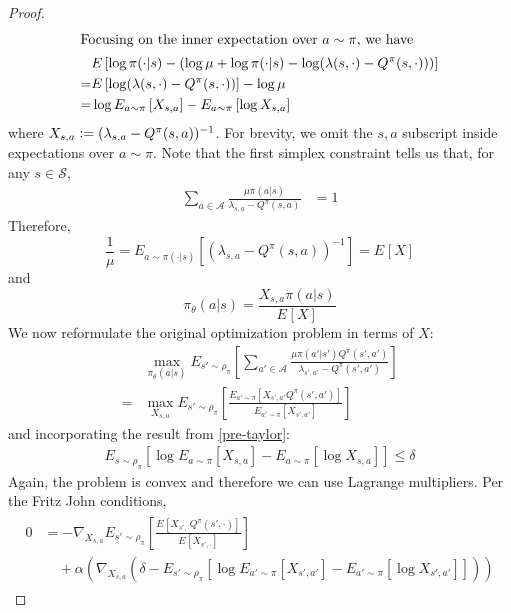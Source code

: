 \documentclass{article}
\newcommand{\defeq}{\vcentcolon=}
\newcommand{\states}{\mathcal{S}}
\newcommand{\actions}{\mathcal{A}}
\newcommand{\grad}[1] {\nabla_{#1}}
\newcommand{\E}[2] {E_{#1}\left[#2\right]}
\begin{document}
\begin{proof}
\begin{align}
\intertext{Focusing on the inner expectation over $a\sim\pi$, we have}
       &\E{}{\log\pi(\cdot|s) - \left(\log\mu + \log\pi(\cdot|s)-
       \log(\lambda(s, \cdot) - Q^\pi(s, \cdot))\right) }
       \\
  =& 
       \E{}{\log(\lambda(s, \cdot) - Q^\pi(s, \cdot)) } - \log\mu
       \\
  =& \log\E{a\sim\pi}{X_{s, a}} - \E{a\sim\pi}{\log X_{s, a}}
       \label{pre-taylor}
\end{align}
where $X_{s, a} \defeq (\lambda_{s, a} - Q^\pi(s, a))^{-1}$. For brevity, we
omit the $s, a$ subscript inside expectations over $a\sim\pi$.
Note that the first simplex constraint tells us that, for any $s\in\states$,
\begin{align}
  \sum_{a\in\actions}\frac{\mu\pi(a|s)}{\lambda_{s, a} - Q^\pi(s, a) } &= 1
\end{align}
Therefore,
\begin{equation}
  \frac{1}{\mu} =
  \E{a\sim\pi(\cdot|s)}{(\lambda_{s, a} - Q^\pi(s, a))^{-1}} = \E{}{X}
\end{equation}
and
\begin{equation}
  \pi_\theta(a|s) = \frac{X_{s, a}\pi(a|s)}{\E{}{X}}
\end{equation}
We now reformulate the original optimization problem in terms of $X$:
\begin{align}
  &\max_{\pi_\theta(a|s)}
  \E{s'\sim\rho_\pi}{\sum_{a'\in\actions}\frac{\mu\pi(a'|s')Q^\pi(s',
      a')}{\lambda_{s', a'} -
  Q^\pi(s', a')}}
  \\
  =
  &\max_{X_{s, a}} \E{s'\sim\rho_\pi}{\frac{\E{a'\sim\pi}{X_{s',
        a'}Q^\pi(s',
  a')}}{\E{a'\sim\pi}{X_{s', a'}}}} \label{opt2}
\end{align}
and incorporating the result from \ref{pre-taylor}:
\begin{align}
  \E{s\sim\rho_\pi}{\log\E{a\sim\pi}{X_{s, a}} - \E{a\sim\pi}{\log X_{s, a}}} \le \delta
  \label{constraint2}
\end{align}
Again, the problem is convex and therefore we can use Lagrange multipliers.
Per the Fritz John conditions,
\begin{align}
  \begin{split}
  0 &=-\grad{X_{s, a}}\E{s'\sim\rho_\pi}{\frac{\E{}{X_{s', \cdot}Q^\pi(s',
  \cdot)}}{\E{}{X_{s', \cdot}}}}\\
  &\quad+ \alpha \left(\grad{X_{s, a}} \left(\delta -
      \E{s'\sim\rho_\pi}{\log\E{a'\sim\pi}{X_{s', a'}} -
    \E{a'\sim\pi}{\log X_{s', a'}}}\right) \right)
    \label{fritz-john}

\end{split}
\end{align}
\end{proof}
\end{document}
